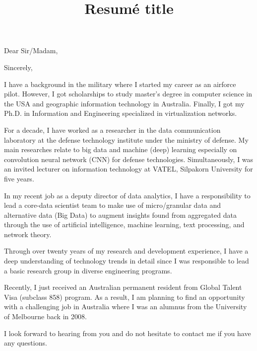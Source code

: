 \documentclass[11pt,a4paper,roman]{moderncv}        %
\title{Resumé title}                               %
\begin{document}
\recipient{}{}
\opening{Dear Sir/Madam,}
\closing{Sincerely,}
\makelettertitle


I have a background in the military where I started my career as an airforce pilot. However, I got scholarships to study master's degree in computer science in the USA  and geographic information technology in Australia. Finally, I got my Ph.D. in Information and Engineering specialized in virtualization networks.

For a decade, I have worked as a researcher in the data communication laboratory at the defense technology institute under the ministry of defense. My main researches relate to big data and machine (deep) learning especially on convolution neural network (CNN) for defense technologies. Simultaneously, I was an invited lecturer on information technology at VATEL, Silpakorn University for five years.

In my recent job as a deputy director of data analytics, I have a responsibility to lead a core-data scientist team to make use of micro/granular data and alternative data (Big Data) to augment insights found from aggregated data through the use of artificial intelligence, machine learning, text processing, and network theory.

Through over twenty years of my research and development experience, I have a deep understanding of technology trends in detail since I was responsible to lead a basic research group in diverse engineering programs.

Recently, I just received an Australian permanent resident from Global Talent Visa (subclass 858) program. As a result, I am planning to find an opportunity with a challenging job in Australia where I was an alumnus from the University of Melbourne back in 2008. 

I look forward to hearing from you and do not hesitate to contact me if you have any questions.



\vspace{0.5cm}


\makeletterclosing
\end{document}
